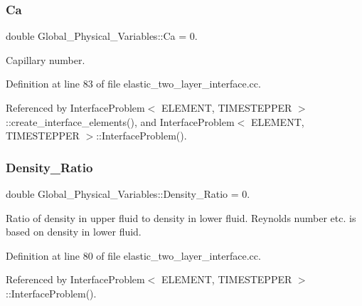 \subsubsection{\texorpdfstring{Ca}{Ca}}
{\footnotesize\ttfamily double Global\+\_\+\+Physical\+\_\+\+Variables\+::\+Ca = 0.}



Capillary number. 



Definition at line 83 of file elastic\+\_\+two\+\_\+layer\+\_\+interface.\+cc.



Referenced by Interface\+Problem$<$ E\+L\+E\+M\+E\+N\+T, T\+I\+M\+E\+S\+T\+E\+P\+P\+E\+R $>$\+::create\+\_\+interface\+\_\+elements(), and Interface\+Problem$<$ E\+L\+E\+M\+E\+N\+T, T\+I\+M\+E\+S\+T\+E\+P\+P\+E\+R $>$\+::\+Interface\+Problem().

\mbox{\label{namespaceGlobal__Physical__Variables_a80a34b6dfb7e1501966b8d6c7501e718}} 
\subsubsection{\texorpdfstring{Density\+\_\+\+Ratio}{Density\_Ratio}}
{\footnotesize\ttfamily double Global\+\_\+\+Physical\+\_\+\+Variables\+::\+Density\+\_\+\+Ratio = 0.}



Ratio of density in upper fluid to density in lower fluid. Reynolds number etc. is based on density in lower fluid. 



Definition at line 80 of file elastic\+\_\+two\+\_\+layer\+\_\+interface.\+cc.



Referenced by Interface\+Problem$<$ E\+L\+E\+M\+E\+N\+T, T\+I\+M\+E\+S\+T\+E\+P\+P\+E\+R $>$\+::\+Interface\+Problem().

\mbox{\label{namespaceGlobal__Physical__Variables_a3962c36313826b19f216f6bbbdd6a477}} 
